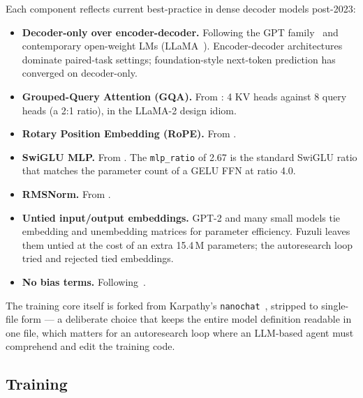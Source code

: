 \documentclass[11pt,a4paper]{article}
\begin{document}
Each component reflects current best-practice in dense decoder models
post-2023:
\begin{itemize}[leftmargin=*,nosep]
  \item \textbf{Decoder-only over encoder-decoder.} Following the GPT
    family~\citep{brown2020gpt3} and contemporary open-weight LMs
    (LLaMA~\citep{touvron2023llama2}). Encoder-decoder
    architectures~\citep{raffel2020t5} dominate paired-task settings;
    foundation-style next-token prediction has converged on decoder-only.
  \item \textbf{Grouped-Query Attention (GQA).} From
    \citet{ainslie2023gqa}: 4 KV heads against 8 query heads (a 2:1
    ratio), in the LLaMA-2 design idiom.
  \item \textbf{Rotary Position Embedding (RoPE).} From
    \citet{su2021roformer}.
  \item \textbf{SwiGLU MLP.} From \citet{shazeer2020glu}. The
    \texttt{mlp\_ratio} of 2.67 is the standard SwiGLU ratio that matches
    the parameter count of a GELU FFN at ratio 4.0.
  \item \textbf{RMSNorm.} From \citet{zhang2019rmsnorm}.
  \item \textbf{Untied input/output embeddings.} GPT-2 and many small
    models tie embedding and unembedding matrices for parameter efficiency.
    Fuzuli leaves them untied at the cost of an extra 15.4\,M parameters;
    the autoresearch loop tried and rejected tied embeddings.
  \item \textbf{No bias terms.} Following~\citep{touvron2023llama2}.
\end{itemize}

The training core itself is forked from Karpathy's
\texttt{nanochat}~\citep{karpathy2024nanochat}, stripped to single-file
form --- a deliberate choice that keeps the entire model definition readable
in one file, which matters for an autoresearch loop where an LLM-based
agent must comprehend and edit the training code.

\subsection{Training}
\end{document}
